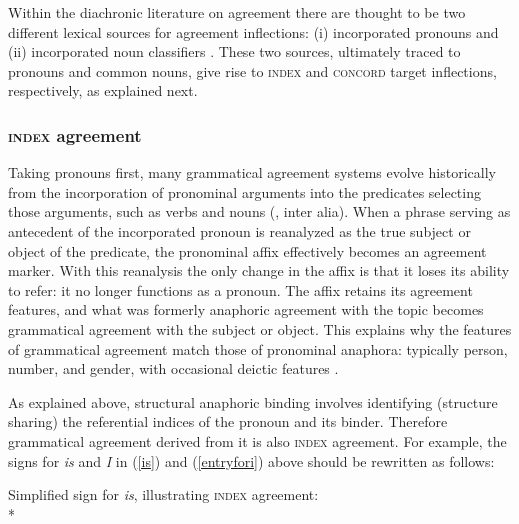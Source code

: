 \documentclass[output=paper
 	        ,biblatex
                ,babelshorthands
                ,newtxmath
                ,draftmode
                ,colorlinks, citecolor=brown
]{langscibook}
\begin{document}
Within the diachronic literature on agreement there are thought to be two different lexical sources for agreement inflections: (i) incorporated pronouns and (ii) incorporated noun classifiers \citep{greenberg:1978}.  
These two sources, ultimately traced to pronouns and common nouns, give rise to \textsc{index} and \textsc{concord} target inflections, respectively, as explained next.    


\subsubsection{\textsc{index} agreement}
Taking pronouns first, many grammatical agreement systems evolve historically from the incorporation of pronominal arguments into the predicates selecting those arguments, such as verbs and nouns (\citealt{bopp:1842,givon:1976,wald:1979}, inter alia).  When a phrase serving as antecedent of the incorporated pronoun is reanalyzed as the true subject or object of the predicate,  the pronominal affix effectively becomes an agreement marker.  With this reanalysis the only change in the affix is that it loses its ability to refer: it no longer functions as a pronoun.   The affix retains its agreement features, and what was formerly anaphoric agreement with the topic becomes grammatical agreement with the subject or object.  This explains why the features of grammatical agreement match those of pronominal anaphora: typically person, number, and gender, with occasional deictic features  \citep[752]{bresnan+mchombo:1987}.   

As explained above, structural anaphoric binding involves identifying (structure sharing) the referential indices of the pronoun and its binder.   Therefore grammatical agreement derived from it is also \textsc{index} agreement.   For example, the signs for  \textit{is} and \textit{I} in (\ref{is}) and (\ref{entryfori}) above should be rewritten as follows:

\begin{exe} 

\ex\label{is2}\label{le-is}
	Simplified sign for \textit{is}, illustrating \textsc{index} agreement:\\*
\end{exe}
\end{document}
